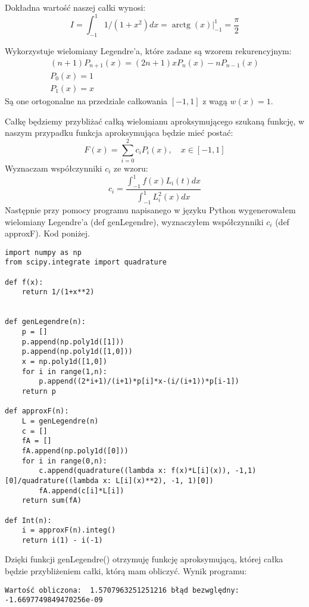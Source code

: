 \documentclass[5]{article}
\begin{document}
Dokładna wartość naszej całki wynosi:
$$
I=\int_{-1}^{1} 1 /\left(1+x^{2}\right) d x=\left.\operatorname{arctg}(x)\right|_{-1} ^{1}=\frac{\pi}{2}
$$
\newline

Wykorzystuje wielomiany Legendre'a, które zadane są wzorem rekurencyjnym:
$$
\begin{array}{c}
(n+1) P_{n+1}(x)=(2 n+1) x P_{n}(x)-n P_{n-1}(x) \\
P_{0}(x)=1 \\
P_{1}(x)=x
\end{array}
$$
Są one ortogonalne na przedziale całkowania $[-1,1]$ z wagą $w(x)=1$.
\newline

Całkę będziemy przybliżać całką wielomianu aproksymującego szukaną funkcję, w naszym przypadku funkcja aproksymująca będzie mieć postać:
$$
F(x)=\sum_{i=0}^{2} c_{i} P_{i}(x), \quad x \in[-1,1]
$$
Wyznaczam współczynniki $c_{i}$ ze wzoru:
$$
c_{i}=\frac{\int_{-1}^{1} f(x) L_{i}(t) d x}{\int_{-1}^{1} L_{i}^{2}(x) d x}
$$
\newline
Następnie przy pomocy programu napisanego w języku Python wygenerowałem wielomiany Legendre'a (def genLegendre), wyznaczyłem współczynniki $c_{i}$ (def approxF). Kod poniżej.


\begin{verbatim}
import numpy as np
from scipy.integrate import quadrature

def f(x):
    return 1/(1+x**2)


def genLegendre(n):
    p = []
    p.append(np.poly1d([1]))
    p.append(np.poly1d([1,0]))
    x = np.poly1d([1,0])
    for i in range(1,n):
        p.append((2*i+1)/(i+1)*p[i]*x-(i/(i+1))*p[i-1])
    return p

def approxF(n):
    L = genLegendre(n)
    c = []
    fA = []
    fA.append(np.poly1d([0]))
    for i in range(0,n):
        c.append(quadrature((lambda x: f(x)*L[i](x)), -1,1)[0]/quadrature((lambda x: L[i](x)**2), -1, 1)[0])
        fA.append(c[i]*L[i])
    return sum(fA)

def Int(n):
    i = approxF(n).integ()
    return i(1) - i(-1)
\end{verbatim}

Dzięki funkcji genLegendre() otrzymuję funkcję aproksymującą, której całka będzie przybliżeniem całki, którą mam obliczyć. Wynik programu:

\begin{verbatim}
Wartość obliczona:  1.5707963251251216 błąd bezwględny:  -1.6697749849470256e-09
\end{verbatim}
\end{document}
